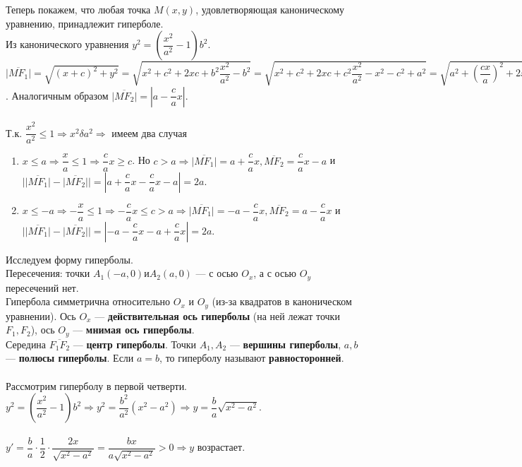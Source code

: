 \documentclass[a4paper, 12pt]{report}
\begin{document}
Теперь покажем, что любая точка $M(x, y)$, удовлетворяющая каноническому уравнению, принадлежит гиперболе.\\
Из канонического уравнения $y^2 = (\dfrac{x^2}{a^2} - 1)b^2$. $\overline{|MF_1|} = \sqrt{(x+c)^2 + y^2} = \sqrt{x^2+c^2+2xc+b^2\dfrac{x^2}{a^2}-b^2} = \sqrt{x^2 + c^2 + 2xc+ c^2\dfrac{x^2}{a^2} - x^2 - c^2 + a^2} = \sqrt{a^2 + (\dfrac{cx}{a})^2 + 2xc} = |a + \dfrac{c}{a}x|$. Аналогичным образом $\overline{|MF_2|} = |a - \dfrac{c}{a}x|$.\\\\
Т.к. $\dfrac{x^2}{a^2} \leqslant 1 \Rightarrow x^2 \delta a^2 \Rightarrow $ имеем два случая\begin{enumerate}
	\item $x \leqslant a \Rightarrow \dfrac{x}{a} \leqslant 1 \Rightarrow \dfrac{c}{a}x \geqslant c$. Но $c > a \Rightarrow \overline{|MF_1|} = a + \dfrac{c}{a}x, \overline{MF_2} = \dfrac{c}{a}x - a$ и $\big|\overline{|MF_1|} - \overline{|MF_2|}\big| = |a + \dfrac{c}{a}x - \dfrac{c}{a}x - a| = 2a$.
	\item $x \leq -a \Rightarrow -\dfrac{x}{a} \leqslant 1 \Rightarrow -\dfrac{c}{a}x \leqslant c > a \Rightarrow \overline{|MF_1|} = -a - \dfrac{c}{a}x, \overline{MF_2} = a - \dfrac{c}{a}x$ и $\big|\overline{|MF_1|} - \overline{|MF_2|}\big| = |-a - \dfrac{c}{a}x - a + \dfrac{c}{a}x| = 2a$.
\end{enumerate}
Исследуем форму гиперболы.\\
Пересечения: точки $A_1(-a, 0) и A_2(a, 0)$ --- с осью $O_x$, а с осью $O_y$ пересечений нет.\\
Гипербола симметрична относительно $O_x$ и $O_y$ (из-за квадратов в каноническом уравнении). Ось $O_x$ --- \textbf{действительная ось гиперболы} (на ней лежат точки $F_1, F_2$), ось $O_y$ --- \textbf{мнимая ось гиперболы}.\\
Середина $\overline{F_1F_2}$ --- \textbf{центр гиперболы}. Точки $A_1, A_2$ --- \textbf{вершины гиперболы}, $a, b$ --- \textbf{полюсы гиперболы}. Если $a = b$, то гиперболу называют \textbf{равносторонней}.\\\\
Рассмотрим гиперболу в первой четверти. $y^2 = (\dfrac{x^2}{a^2} - 1)b^2 \Rightarrow y^2 = \dfrac{b^2}{a^2}(x^2-a^2) \Rightarrow y = \dfrac{b}{a}\sqrt{x^2-a^2}$.\\\\
$y' = \dfrac{b}{a}\cdot\dfrac{1}{2}\cdot\dfrac{2x}{\sqrt{x^2-a^2}}=\dfrac{bx}{a\sqrt{x^2-a^2}} > 0 \Rightarrow y$ возрастает.\\\\
\end{document}
